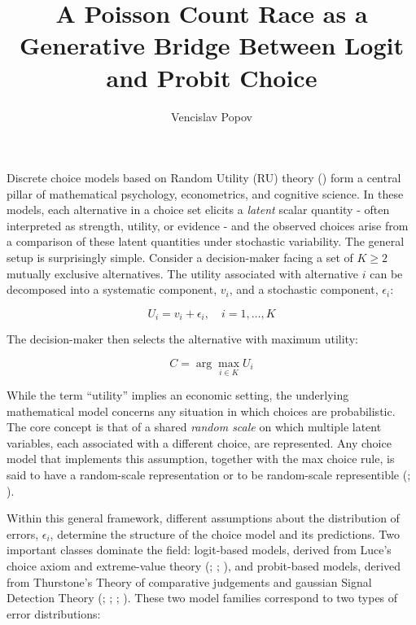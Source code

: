 \documentclass[
  man,
  floatsintext,
  longtable,
  a4paper,
  nolmodern,
  notxfonts,
  notimes,
  colorlinks=true,linkcolor=blue,citecolor=blue,urlcolor=blue]{apa7}
\title{A Poisson Count Race as a Generative Bridge Between Logit and
Probit Choice}
\author{Vencislav Popov}
\affiliation{
{Department of Psychology, University of Zurich}}
\begin{document}
\maketitle



\setcounter{secnumdepth}{3}

\setlength\LTleft{0pt}




Discrete choice models based on Random Utility (RU) theory
()
form a central pillar of mathematical psychology, econometrics, and
cognitive science. In these models, each alternative in a choice set
elicits a \emph{latent} scalar quantity - often interpreted as strength,
utility, or evidence - and the observed choices arise from a comparison
of these latent quantities under stochastic variability. The general
setup is surprisingly simple. Consider a decision-maker facing a set of
\(K \ge 2\) mutually exclusive alternatives. The utility associated with
alternative \(i\) can be decomposed into a systematic component,
\(v_i\), and a stochastic component, \(\epsilon_i\):

\[
U_{i} = v_{i} + \epsilon_{i}, \quad i=1, \dots, K
\]

The decision-maker then selects the alternative with maximum utility:

\[
C = \arg \max_{i \in K} U_{i}
\]

While the term ``utility'' implies an economic setting, the underlying
mathematical model concerns any situation in which choices are
probabilistic. The core concept is that of a shared \emph{random scale}
on which multiple latent variables, each associated with a different
choice, are represented. Any choice model that implements this
assumption, together with the max choice rule, is said to have a
random-scale representation or to be random-scale representible
(; ).

Within this general framework, different assumptions about the
distribution of errors, \(\epsilon_i\), determine the structure of the
choice model and its predictions. Two important classes dominate the
field: logit-based models, derived from Luce's choice axiom and
extreme-value theory
(;
;
), and
probit-based models, derived from Thurstone's Theory of comparative
judgements and gaussian Signal Detection Theory
(; ;
;
). These
two model families correspond to two types of error distributions:
\end{document}
